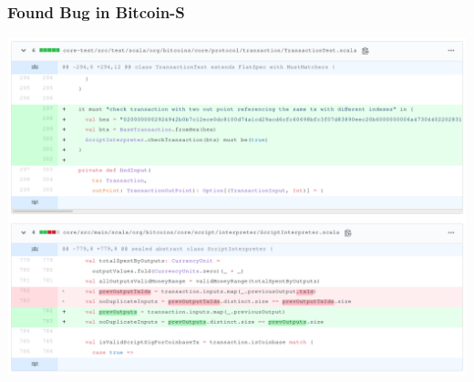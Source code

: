 \documentclass{beamer}
\begin{document}
\begin{frame}
\frametitle{Found Bug in Bitcoin-S}
\includegraphics[width=\textwidth,height=0.8\textheight,keepaspectratio]{assets/bitcoin-s-pr.png}
\end{frame}
\end{document}
